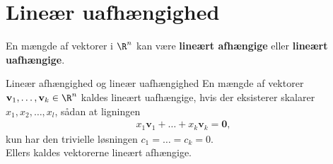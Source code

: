 \section{Lineær uafhængighed}
En mængde af vektorer i $\R^n$ kan være \textbf{lineært afhængige} eller \textbf{lineært uafhængige}.
%
%
% 
\begin{defn}{Lineær afhængighed og lineær uafhængighed}{}
En mængde af vektorer $\mathbf{v}_1, \ldots , \mathbf{v}_k \in \R^n$ kaldes lineært uafhængige, hvis der eksisterer skalarer $x_1,x_2, \ldots , x_l$, sådan at ligningen 
\begin{align*}
x_1\mathbf{v}_1 + \ldots + x_k \mathbf{v}_k = \mathbf{0}, 
\end{align*}
kun har den trivielle løsningen $c_1 = \ldots = c_k = 0$.
\\
Ellers kaldes vektorerne lineært afhængige.
\end{defn}  
%
